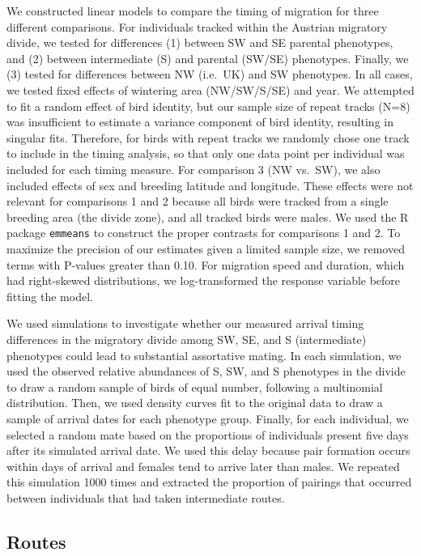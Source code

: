 \documentclass[a4paper, nobind]{templates/ociamthesis}
\begin{document}
We constructed linear models to compare the timing of migration for three different comparisons. For individuals tracked within the Austrian migratory divide, we tested for differences (1) between SW and SE parental phenotypes, and (2) between intermediate (S) and parental (SW/SE) phenotypes. Finally, we (3) tested for differences between NW (i.e.~UK) and SW phenotypes. In all cases, we tested fixed effects of wintering area (NW/SW/S/SE) and year. We attempted to fit a random effect of bird identity, but our sample size of repeat tracks (N=8) was insufficient to estimate a variance component of bird identity, resulting in singular fits. Therefore, for birds with repeat tracks we randomly chose one track to include in the timing analysis, so that only one data point per individual was included for each timing measure. For comparison 3 (NW vs.~SW), we also included effects of sex and breeding latitude and longitude. These effects were not relevant for comparisons 1 and 2 because all birds were tracked from a single breeding area (the divide zone), and all tracked birds were males. We used the R package \texttt{emmeans} \autocite{lenthEmmeansEstimatedMarginal2019} to construct the proper contrasts for comparisons 1 and 2. To maximize the precision of our estimates given a limited sample size, we removed terms with P-values greater than 0.10. For migration speed and duration, which had right-skewed distributions, we log-transformed the response variable before fitting the model.

We used simulations to investigate whether our measured arrival timing differences in the migratory divide among SW, SE, and S (intermediate) phenotypes could lead to substantial assortative mating. In each simulation, we used the observed relative abundances of S, SW, and S phenotypes in the divide to draw a random sample of birds of equal number, following a multinomial distribution. Then, we used density curves fit to the original data to draw a sample of arrival dates for each phenotype group. Finally, for each individual, we selected a random mate based on the proportions of individuals present five days after its simulated arrival date. We used this delay because pair formation occurs within days of arrival \autocite{bairleinUeberBiologieSuedwestdeutschen1978} and females tend to arrive later than males. We repeated this simulation 1000 times and extracted the proportion of pairings that occurred between individuals that had taken intermediate routes.

\hypertarget{routes}{%
\subsection{Routes}\label{routes}}
\end{document}
